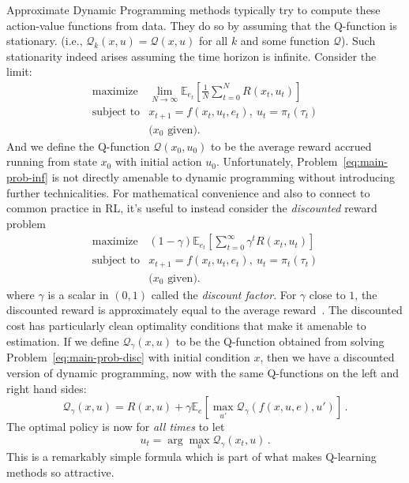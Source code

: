 \documentclass[11pt]{article}
\newcommand{\eqd}[1]{\eqref{eq:#1}}
\numberwithin{equation}{section}
\newcommand{\E}{\mathbb{E}}
\begin{document}
Approximate Dynamic Programming methods typically try to compute these action-value functions from data. They do so by assuming that the Q-function is stationary. (i.e., $\mathcal{Q}_k(x,u) = \mathcal{Q}(x,u)$ for all $k$ and some function $\mathcal{Q}$). Such stationarity indeed arises assuming the time horizon is infinite. Consider the limit:
\begin{equation}\label{eq:main-prob-inf}
\begin{array}{ll}
\mbox{maximize} & \lim_{N\rightarrow \infty}  \E_{e_t}[ \frac{1}{N} \sum_{t=0}^N R(x_t,u_t) ]\\
\mbox{subject to} &	x_{t+1} = f(x_t, u_t, e_t),~u_t=\pi_t(\tau_t)\\
& \mbox{($x_0$ given).}
\end{array}
\end{equation}
And we define the Q-function $\mathcal{Q}(x_0,u_0)$ to be the average reward accrued running from state $x_0$ with initial action $u_0$.
Unfortunately, Problem~\eqd{main-prob-inf} is not directly amenable to dynamic programming without introducing further technicalities. For
mathematical convenience and also to connect to common practice in RL, it's useful to instead consider the \emph{discounted} reward problem
\begin{equation}\label{eq:main-prob-disc}	
	\begin{array}{ll}	
		\mbox{maximize} &  (1-\gamma) \E_{e_t}[ \sum_{t=0}^\infty \gamma^t R(x_t,u_t) ]\\
		\mbox{subject to} &	x_{t+1} = f(x_t, u_t, e_t),~u_t=\pi_t(\tau_t)\\
		& \mbox{($x_0$ given).}
	\end{array}
\end{equation}
where $\gamma$ is a scalar in $(0,1)$ called the \emph{discount factor}. For $\gamma$ close to $1$, the discounted reward is approximately equal to the average reward~\cite{BertsekasDPBook2}. The discounted cost has particularly clean optimality conditions that make it amenable to estimation.
If we define $\mathcal{Q}_\gamma(x,u)$ to be the Q-function obtained from solving Problem~\eqd{main-prob-disc} with initial condition $x$, then we have a discounted version of dynamic programming, now with the same Q-functions on the left and right hand sides:
\begin{equation*}\label{eq:bellman}
	\mathcal{Q}_\gamma(x,u) = R(x,u) + \gamma \E_{e} \left[ \max_{u'} \mathcal{Q}_\gamma(f(x,u,e),u')\right]\,.
\end{equation*}
The optimal policy is now for \emph{all times} to let 
\begin{equation}\label{eq:opt-q-policy}
	u_t= \arg\max_u \mathcal{Q}_\gamma(x_t,u)\,.
\end{equation} 
This is a remarkably simple formula which is part of what makes Q-learning methods so attractive.
\end{document}
